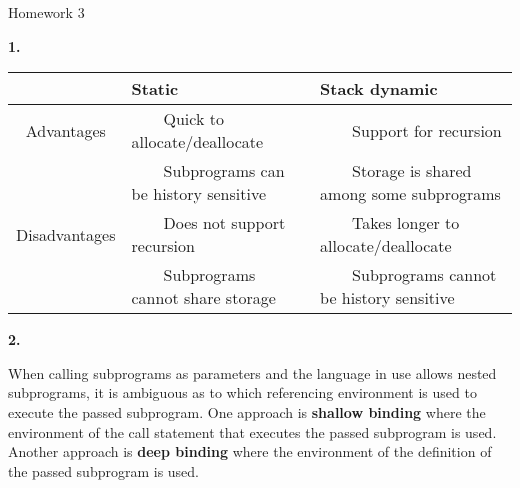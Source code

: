 \documentclass[letterpaper, 11pt]{article}
\newcommand{\hwnumber}[1]{\medskip \noindent\textbf{#1.} \smallskip}
\newcommand{\tabitem}{~~\llap{\textbullet}~~}
\begin{document}
\begin{center}
	{\LARGE Homework 3}\\
\end{center}

\hwnumber{1}

\begin{center}
\begin{adjustbox}{width={\textwidth},keepaspectratio}
\begin{tabular}{c | l l}
	& Static & Stack dynamic \\
	\hline
	Advantages & \tabitem Quick to allocate/deallocate & \tabitem Support for recursion\\
		   & \tabitem Subprograms can be history sensitive & \tabitem Storage is shared among some subprograms\\
	Disadvantages & \tabitem Does not support recursion & \tabitem Takes longer to allocate/deallocate \\
		      & \tabitem Subprograms cannot share storage & \tabitem Subprograms cannot be history sensitive \\
\end{tabular}
\end{adjustbox}
\end{center}

\hwnumber{2}

When calling subprograms as parameters and the language in use allows nested
subprograms, it is ambiguous as to which referencing environment is used to
execute the passed subprogram. One approach is \textbf{shallow binding} where
the environment of the call statement that executes the passed subprogram is
used. Another approach is \textbf{deep binding} where the environment of the
definition of the passed subprogram is used. 
\end{document}

